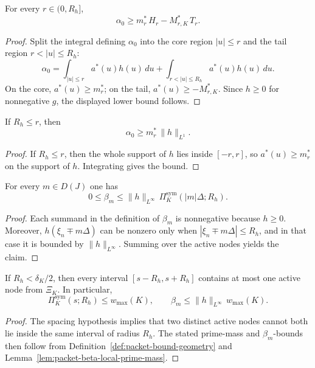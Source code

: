 \begin{lemma}\label{lem:packet-alpha-diagonal-core-tail}
For every $r\in(0,R_h]$,
\[
  \alpha_0
  \ge
  m_r^*\,H_r - M_{r,K}^*\,T_r.
\]
\end{lemma}

\begin{proof}
Split the integral defining $\alpha_0$ into the core region $|u|\le r$ and the
tail region $r<|u|\le R_h$:
\[
  \alpha_0
  =
  \int_{|u|\le r} a^*(u)h(u)\,du
  +
  \int_{r<|u|\le R_h} a^*(u)h(u)\,du.
\]
On the core, $a^*(u)\ge m_r^*$; on the tail,
$a^*(u)\ge -M_{r,K}^*$. Since $h\ge0$ for nonnegative $g$, the displayed lower
bound follows.
\end{proof}

\begin{lemma}\label{lem:packet-alpha-diagonal-core}
If $R_h\le r$, then
\[
  \alpha_0\ge m_r^*\,\|h\|_{L^1}.
\]
\end{lemma}

\begin{proof}
If $R_h\le r$, then the whole support of $h$ lies inside $[-r,r]$, so
$a^*(u)\ge m_r^*$ on the support of $h$. Integrating gives the bound.
\end{proof}

\begin{lemma}\label{lem:packet-beta-local-prime-mass}
For every $m\in D(J)$ one has
\[
  0\le \beta_m \le \|h\|_{L^\infty}\,\Pi_K^{\mathrm{sym}}(|m|\Delta;R_h).
\]
\end{lemma}

\begin{proof}
Each summand in the definition of $\beta_m$ is nonnegative because $h\ge0$.
Moreover, $h(\xi_n\mp m\Delta)$ can be nonzero only when
$|\xi_n\mp m\Delta|\le R_h$, and in that case it is bounded by
$\|h\|_{L^\infty}$. Summing over the active nodes yields the claim.
\end{proof}

\begin{lemma}\label{lem:packet-beta-spacing}
If $R_h<\delta_K/2$, then every interval $[s-R_h,s+R_h]$ contains at most one
active node from $\Xi_K$. In particular,
\[
  \Pi_K^{\mathrm{sym}}(s;R_h)\le w_{\max}(K),
  \qquad
  \beta_m\le \|h\|_{L^\infty}\,w_{\max}(K).
\]
\end{lemma}

\begin{proof}
The spacing hypothesis implies that two distinct active nodes cannot both lie
inside the same interval of radius $R_h$. The stated prime-mass and
$\beta_m$-bounds then follow from Definition~\ref{def:packet-bound-geometry}
and Lemma~\ref{lem:packet-beta-local-prime-mass}.
\end{proof}

